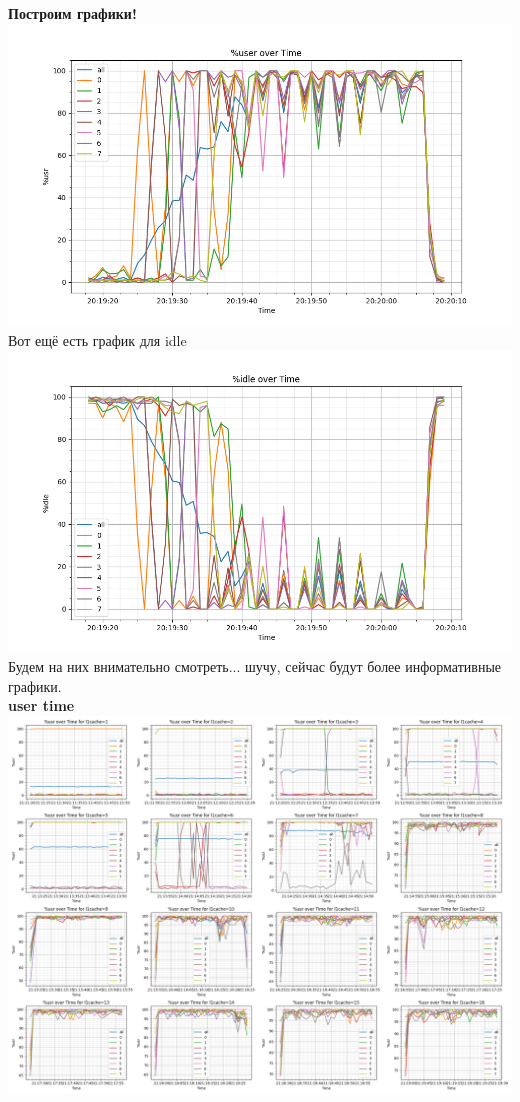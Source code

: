\textbf{Построим графики!}\\
\includegraphics[width=\textwidth]{./cache/image/l1cache-usr-cpu.png}
Вот ещё есть график для idle\\
\includegraphics[width=\textwidth]{./cache/image/l1cache-idle-cpu.png}
Будем на них внимательно смотреть... шучу, сейчас будут более информативные графики.\\
\textbf{user time}\\
\includegraphics[width=\textwidth]{./cache/image/l1cache-each-usr-cpu.png}
